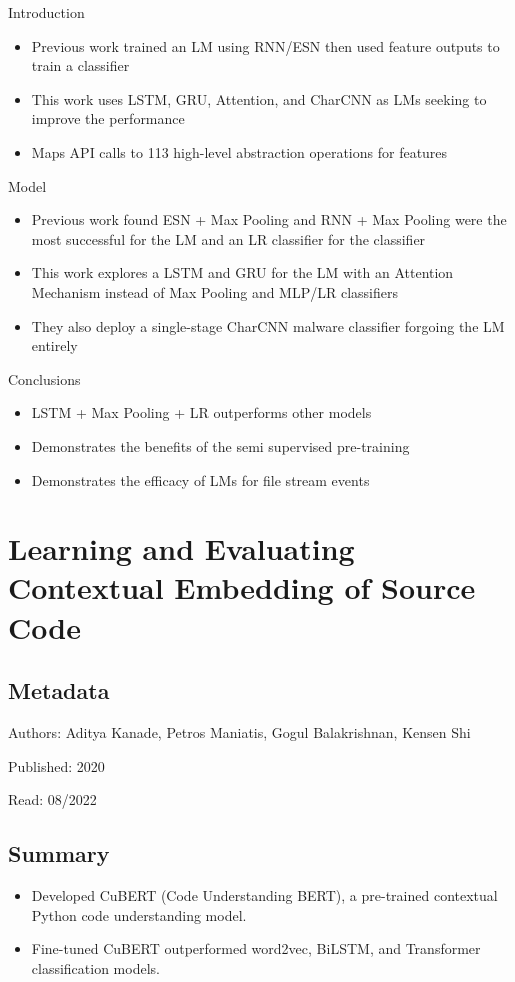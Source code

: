 \documentclass{article}
\begin{document}
Introduction
\begin{itemize}
\item Previous work trained an LM using RNN/ESN then used feature outputs to train a classifier
\item This work uses LSTM, GRU, Attention, and CharCNN as LMs seeking to improve the performance
\item Maps API calls to 113 high-level abstraction operations for features
\end{itemize}
Model
\begin{itemize}
\item Previous work found ESN + Max Pooling and RNN + Max Pooling were the most successful for the LM and an LR classifier for the classifier
\item This work explores a LSTM and GRU for the LM with an Attention Mechanism instead of Max Pooling and MLP/LR classifiers
\item They also deploy a single-stage CharCNN malware classifier forgoing the LM entirely
\end{itemize}
Conclusions
\begin{itemize}
\item LSTM + Max Pooling + LR outperforms other models
\item Demonstrates the benefits of the semi supervised pre-training
\item Demonstrates the efficacy of LMs for file stream events
\end{itemize}

\pagebreak


\section*{Learning and Evaluating Contextual Embedding of Source Code}

\subsection*{Metadata}

\noindent Authors: Aditya Kanade, Petros Maniatis, Gogul Balakrishnan, Kensen Shi

\noindent Published: 2020

\noindent Read: 08/2022

\subsection*{Summary}
\begin{itemize}
\item Developed CuBERT (Code Understanding BERT), a pre-trained contextual Python code understanding model.
\item Fine-tuned CuBERT outperformed word2vec, BiLSTM, and Transformer classification models.
\end{itemize}
\end{document}
